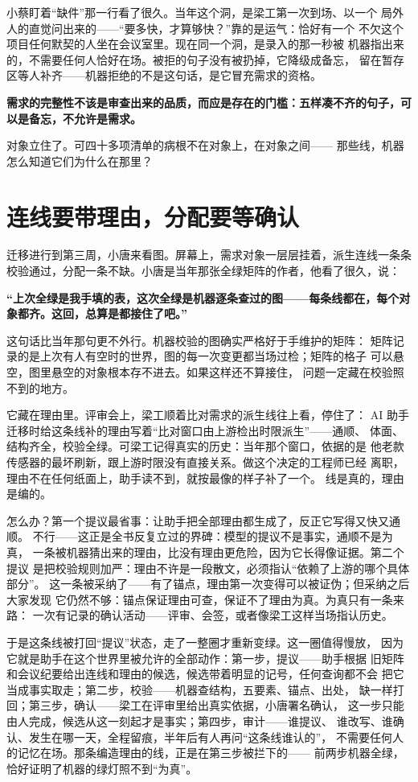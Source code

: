 小蔡盯着“缺件”那一行看了很久。当年这个洞，是梁工第一次到场、以一个
局外人的直觉问出来的——“要多快，才算够快？”靠的是运气：恰好有一个
不欠这个项目任何默契的人坐在会议室里。现在同一个洞，是录入的那一秒被
机器指出来的，不需要任何人恰好在场。被拒的句子没有被扔掉，它降级成备忘，
留在暂存区等人补齐——机器拒绝的不是这句话，是它冒充需求的资格。

\textbf{需求的完整性不该是审查出来的品质，而应是存在的门槛：五样凑不齐的句子，可以是备忘，不允许是需求。}

对象立住了。可四十多项清单的病根不在对象上，在对象之间——
那些线，机器怎么知道它们为什么在那里？

\section{连线要带理由，分配要等确认}

迁移进行到第三周，小唐来看图。屏幕上，需求对象一层层挂着，派生连线一条条
校验通过，分配一条不缺。小唐是当年那张全绿矩阵的作者，他看了很久，说：

\textbf{“上次全绿是我手填的表，这次全绿是机器逐条查过的图——每条线都在，每个对象都齐。这回，总算是都接住了吧。”}

这句话比当年那句更不外行。机器校验的图确实严格好于手维护的矩阵：
矩阵记录的是上次有人有空时的世界，图的每一次变更都当场过检；矩阵的格子
可以悬空，图里悬空的对象根本存不进去。如果这样还不算接住，
问题一定藏在校验照不到的地方。

它藏在理由里。评审会上，梁工顺着比对需求的派生线往上看，停住了：
AI 助手迁移时给这条线补的理由写着“比对窗口由上游检出时限派生”——通顺、
体面、结构齐全，校验全绿。可梁工记得真实的历史：当年那个窗口，依据的是
他老款传感器的最坏刷新，跟上游时限没有直接关系。做这个决定的工程师已经
离职，理由不在任何纸面上，助手读不到，就按最像的样子补了一个。
线是真的，理由是编的。

怎么办？第一个提议最省事：让助手把全部理由都生成了，反正它写得又快又通顺。
不行——这正是全书反复立过的界碑：模型的提议不是事实，通顺不是为真，
一条被机器猜出来的理由，比没有理由更危险，因为它长得像证据。第二个提议
是把校验规则加严：理由不许是一段散文，必须指认“依赖了上游的哪个具体部分”。
这一条被采纳了——有了锚点，理由第一次变得可以被证伪；但采纳之后大家发现
它仍然不够：锚点保证理由可查，保证不了理由为真。为真只有一条来路：
一次有记录的确认活动——评审、会签，或者像梁工这样当场指认历史。

于是这条线被打回“提议”状态，走了一整圈才重新变绿。这一圈值得慢放，
因为它就是助手在这个世界里被允许的全部动作：第一步，提议——助手根据
旧矩阵和会议纪要给出连线和理由的候选，候选带着明显的记号，任何查询都不会
把它当成事实取走；第二步，校验——机器查结构，五要素、锚点、出处，
缺一样打回；第三步，确认——梁工在评审里给出真实依据，小唐署名确认，
这一步只能由人完成，候选从这一刻起才是事实；第四步，审计——谁提议、
谁改写、谁确认、发生在哪一天，全程留痕，半年后有人再问“这条线谁认的”，
不需要任何人的记忆在场。那条编造理由的线，正是在第三步被拦下的——
前两步机器全绿，恰好证明了机器的绿灯照不到“为真”。

